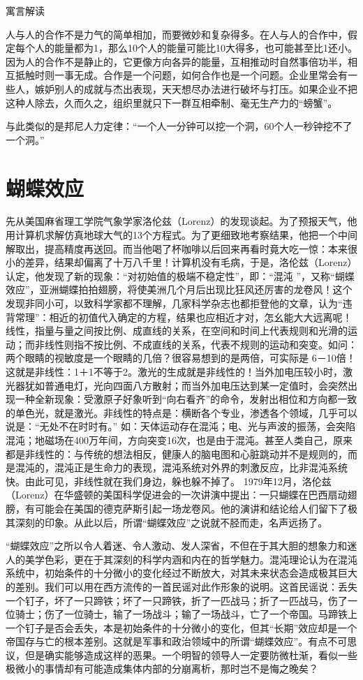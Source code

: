 \documentclass[11pt]{ctexart}
\begin{document}
寓言解读

人与人的合作不是力气的简单相加，而要微妙和复杂得多。在人与人的合作中，假定每个人的能量都为1，那么10个人的能量可能比10大得多，也可能甚至比1还小。因为人的合作不是静止的，它更像方向各异的能量，互相推动时自然事倍功半，相互抵触时则一事无成。合作是一个问题，如何合作也是一个问题。企业里常会有一些人，嫉妒别人的成就与杰出表现，天天想尽办法进行破坏与打压。如果企业不把这种人除去，久而久之，组织里就只下一群互相牵制、毫无生产力的“螃蟹”。

与此类似的是邦尼人力定律：“一个人一分钟可以挖一个洞，60个人一秒钟挖不了一个洞。”
\section{蝴蝶效应}
\label{sec-46}


先从美国麻省理工学院气象学家洛伦兹（Lorenz）的发现谈起。为了预报天气，他用计算机求解仿真地球大气的13个方程式。为了更细致地考察结果，他把一个中间解取出，提高精度再送回。而当他喝了杯咖啡以后回来再看时竟大吃一惊：本来很小的差异，结果却偏离了十万八千里！计算机没有毛病，于是，洛伦兹（Lorenz）认定，他发现了新的现象：“对初始值的极端不稳定性”，即：“混沌 ”，又称“蝴蝶效应”，亚洲蝴蝶拍拍翅膀，将使美洲几个月后出现比狂风还厉害的龙卷风！这个发现非同小可，以致科学家都不理解，几家科学杂志也都拒登他的文章，认为“违背常理”：相近的初值代入确定的方程，结果也应相近才对，怎幺能大大远离呢！线性，指量与量之间按比例、成直线的关系，在空间和时间上代表规则和光滑的运动；而非线性则指不按比例、不成直线的关系，代表不规则的运动和突变。如问：两个眼睛的视敏度是一个眼睛的几倍？很容易想到的是两倍，可实际是 6－10倍！这就是非线性：1＋1不等于2。激光的生成就是非线性的！当外加电压较小时，激光器犹如普通电灯，光向四面八方散射；而当外加电压达到某一定值时，会突然出现一种全新现象：受激原子好象听到“向右看齐”的命令，发射出相位和方向都一致的单色光，就是激光。非线性的特点是：横断各个专业，渗透各个领域，几乎可以说是：“无处不在时时有。” 如：天体运动存在混沌；电、光与声波的振荡，会突陷混沌；地磁场在400万年间，方向突变16次，也是由于混沌。甚至人类自己，原来都是非线性的：与传统的想法相反，健康人的脑电图和心脏跳动并不是规则的，而是混沌的，混沌正是生命力的表现，混沌系统对外界的刺激反应，比非混沌系统快。由此可见，非线性就在我们身边，躲也躲不掉了。 1979年12月，洛伦兹（Lorenz）在华盛顿的美国科学促进会的一次讲演中提出：一只蝴蝶在巴西扇动翅膀，有可能会在美国的德克萨斯引起一场龙卷风。他的演讲和结论给人们留下了极其深刻的印象。从此以后，所谓“蝴蝶效应”之说就不胫而走，名声远扬了。

“蝴蝶效应”之所以令人着迷、令人激动、发人深省，不但在于其大胆的想象力和迷人的美学色彩，更在于其深刻的科学内涵和内在的哲学魅力。混沌理论认为在混沌系统中，初始条件的十分微小的变化经过不断放大，对其未来状态会造成极其巨大的差别。我们可以用在西方流传的一首民谣对此作形象的说明。这首民谣说：丢失一个钉子，坏了一只蹄铁；坏了一只蹄铁，折了一匹战马；折了一匹战马，伤了一位骑士；伤了一位骑士，输了一场战斗；输了一场战斗，亡了一个帝国。马蹄铁上一个钉子是否会丢失，本是初始条件的十分微小的变化，但其“长期”效应却是一个帝国存与亡的根本差别。这就是军事和政治领域中的所谓“蝴蝶效应”。有点不可思议，但是确实能够造成这样的恶果。一个明智的领导人一定要防微杜渐，看似一些极微小的事情却有可能造成集体内部的分崩离析，那时岂不是悔之晚矣？
\end{document}
